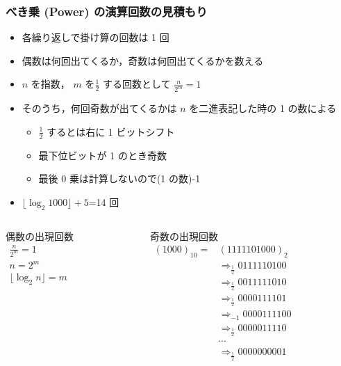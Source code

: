 \begin{frame}
\frametitle{べき乗 (Power) の演算回数の見積もり}
  \begin{itemize}
\scriptsize
\item 各繰り返しで掛け算の回数は 1 回
\item 偶数は何回出てくるか，奇数は何回出てくるかを数える
\item $n$ を指数， $m$ を\(\frac{1}{2}\) する回数として \(\frac{n}{2^m}=1\)
\item そのうち，何回奇数が出てくるかは $n$ を二進表記した時の 1 の数による
    \begin{itemize}
\scriptsize
\item \(\frac{1}{2}\) するとは右に 1 ビットシフト
\item 最下位ビットが 1 のとき奇数
\item 最後 0 乗は計算しないので(1 の数)-1
    \end{itemize}
\item \(\lfloor\log_2 1000\rfloor+5\)=14 回
  \end{itemize}
  \begin{columns}
    \begin{column}{0.45\textwidth}
      \begin{block}{偶数の出現回数}
        \begin{math}
          \begin{array}{c}
\frac{n}{2^m}=1\\
n=2^m\\
\lfloor\log_2 n\rfloor = m
          \end{array}
        \end{math}
      \end{block}
    \end{column}
    \begin{column}{0.5\textwidth}
      \begin{block}{奇数の出現回数}
\scriptsize
        \begin{math}
          \begin{array}{cl}
(1000)_{10}=&(1111101000)_{2}\\
&\Rightarrow_{\frac{1}{2}}0111110100\\
&\Rightarrow_{\frac{1}{2}}0011111010\\
&\Rightarrow_{\frac{1}{2}}0000111101\\
&\Rightarrow_{-1}0000111100\\
&\Rightarrow_{\frac{1}{2}}0000011110\\
&\cdots\\
&\Rightarrow_{\frac{1}{2}}0000000001
          \end{array}
        \end{math}
      \end{block}
    \end{column}
  \end{columns}
\end{frame}
